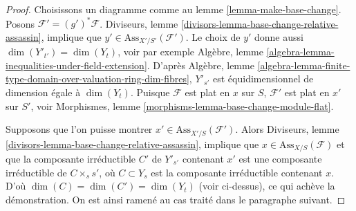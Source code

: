 \begin{proof}
Choisissons un diagramme comme au lemme \ref{lemma-make-base-change}.
Posons $\mathcal{F}' = (g')^*\mathcal{F}$.
Diviseurs, lemme \ref{divisors-lemma-base-change-relative-assassin},
implique que $y' \in \text{Ass}_{X'/S'}(\mathcal{F}')$.
Le choix de $y'$ donne aussi $\dim(Y'_{t'}) = \dim(Y_t)$,
voir par exemple Algèbre, lemme
\ref{algebra-lemma-inequalities-under-field-extension}.
D'après Algèbre, lemme
\ref{algebra-lemma-finite-type-domain-over-valuation-ring-dim-fibres},
$Y'_{s'}$ est équidimensionnel de dimension égale à $\dim(Y_t)$.
Puisque $\mathcal{F}$ est plat en $x$ sur $S$,
$\mathcal{F}'$ est plat en $x'$ sur $S'$, voir
Morphismes, lemme \ref{morphisms-lemma-base-change-module-flat}.

\medskip\noindent
Supposons que l'on puisse montrer $x' \in \text{Ass}_{X'/S}(\mathcal{F}')$. Alors
Diviseurs, lemme \ref{divisors-lemma-base-change-relative-assassin},
implique que $x \in \text{Ass}_{X/S}(\mathcal{F})$ et que
la composante irréductible $C'$ de $Y'_{s'}$ contenant $x'$
est une composante irréductible de $C \times_s s'$, où $C \subset Y_s$
est la composante irréductible contenant $x$.
D'où $\dim(C) = \dim(C') = \dim(Y_t)$ (voir ci-dessus), ce qui achève
la démonstration.
On est ainsi ramené au cas traité dans le paragraphe suivant.


\end{proof}
